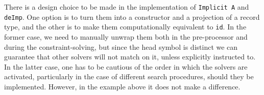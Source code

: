 \begin{imageonly}
\begin{Shaded}
\begin{Highlighting}[]
 

\NormalTok{ (} \OperatorTok{:\textless{}:}
                      \OtherTok{=\textgreater{}} 
\OtherTok{=} 
  \OtherTok{=}
    \NormalTok{ (}\OtherTok{{-}\textgreater{}} 
        \NormalTok{ (}\OtherTok{{-}\textgreater{}}
\NormalTok{        \_ }\OtherTok{{-}\textgreater{}}  
     \OtherTok{{-}\textgreater{}}  

\NormalTok{ (} \OperatorTok{:\textless{}:}
                     \OtherTok{=\textgreater{}} 
\OtherTok{=} \NormalTok{ \{}
\OtherTok{=}
\OtherTok{=}
\OtherTok{=}
\OtherTok{=}\NormalTok{ []}
\OtherTok{=}\NormalTok{ []}
\NormalTok{  \}}
\end{Highlighting}
\end{Shaded}
\end{imageonly}

There is a design choice to be made in the implementation of
\texttt{Implicit\ A} and \texttt{deImp}. One option is to turn them into
a constructor and a projection of a record type, and the other is to
make them computationally equivalent to \texttt{id}. In the former case,
we need to manually unwrap them both in the pre-processor and during the
constraint-solving, but since the head symbol is distinct we can
guarantee that other solvers will not match on it, unless explicitly
instructed to. In the latter case, one has to be cautious of the order
in which the solvers are activated, particularly in the case of
different search procedures, should they be implemented. However, in the
example above it does not make a difference.

